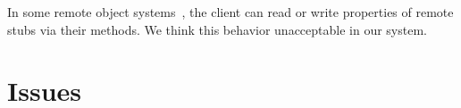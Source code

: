 In some remote object systems~\cite{birrell1993distributed},
the client can read or write properties of remote stubs via their methods.
We think this behavior unacceptable in our system.



\section{Issues}

